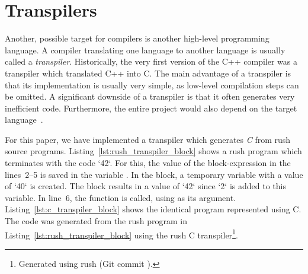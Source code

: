 \section{Transpilers}

Another, possible target for compilers is another high-level programming language.
A compiler translating one language to another language is usually called a \emph{transpiler}.
Historically, the very first version of the C++ compiler was a transpiler which translated C++ into C.
The main advantage of a transpiler is that its implementation is usually very simple, as low-level compilation steps can be omitted.
A significant downside of a transpiler is that it often generates very inefficient code.
Furthermore, the entire project would also depend on the target language~\cite[p.~5]{Jeffery2021}.

For this paper, we have implemented a transpiler which generates \emph{C} from rush source programs.
Listing~\ref{lst:rush_transpiler_block} shows a rush program which terminates with the code `42`.
For this, the value of the block-expression in the lines~2--5 is saved in the variable .
In the block, a temporary variable with a value of `40` is created.
The block results in a value of `42` since `2` is added to this variable.
In line~6, the  function is called, using  as its argument.
Listing~\ref{lst:c_transpiler_block} shows the identical program represented using C.
The code was generated from the rush program in Listing~\ref{lst:rush_transpiler_block} using the rush C transpiler\footnote{Generated using rush (Git commit \rushCommit{}).}.

\begin{minipage}{.34\textwidth}
	\center
\end{minipage}%
\hspace{3cm}%
\begin{minipage}{.45\textwidth}
	\center
	\vspace{.1cm}
\end{minipage}

